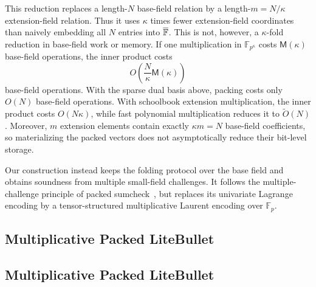 \documentclass[runningheads]{llncs}
\begin{document}
This reduction replaces a length-\(N\) base-field relation by a
length-\(m=N/\kappa\) extension-field relation.  Thus it uses
\(\kappa\) times fewer extension-field coordinates than naively
embedding all \(N\) entries into \(\overline{{\mathbb{F}}}\).  This is not,
however, a \(\kappa\)-fold reduction in base-field work or memory.  If
one multiplication in \(\mathbb F_{p^\kappa}\) costs
\(\mathsf{M}(\kappa)\) base-field operations, the inner product costs
\[
    O\!\left(\frac{N}{\kappa}\mathsf{M}(\kappa)\right)
\]
base-field operations.  With the sparse dual basis above, packing costs
only \(O(N)\) base-field operations.  With schoolbook extension
multiplication, the inner product costs \(O(N\kappa)\), while fast
polynomial multiplication reduces it to \(\widetilde O(N)\).
Moreover, \(m\) extension elements contain exactly
\(\kappa m=N\) base-field coefficients, so materializing the packed
vectors does not asymptotically reduce their bit-level storage.

Our construction instead keeps the folding protocol over the base
field and obtains soundness from multiple small-field challenges.  It
follows the multiple-challenge principle of packed
sumcheck~\cite{iacr/WeiWXZDWZ25}, but replaces its univariate Lagrange
encoding by a tensor-structured multiplicative Laurent encoding over
\(\mathbb F_p\).

\subsection{Multiplicative Packed LiteBullet}
\subsection{Multiplicative Packed LiteBullet}
\label{sec:packed-litebullet}
\end{document}
